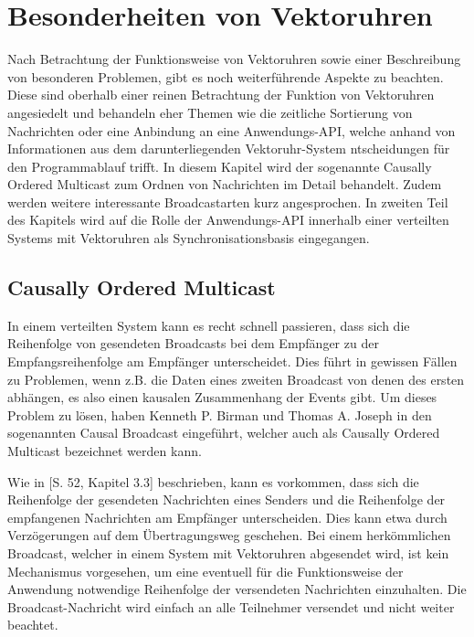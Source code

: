 \section{Besonderheiten von Vektoruhren}

Nach Betrachtung der Funktionsweise von Vektoruhren sowie einer Beschreibung von besonderen Problemen, gibt es noch weiterführende Aspekte zu beachten. Diese sind oberhalb einer reinen Betrachtung der Funktion von Vektoruhren angesiedelt und behandeln eher Themen wie die zeitliche Sortierung von Nachrichten oder eine Anbindung an eine Anwendungs-API, welche anhand von Informationen aus dem darunterliegenden Vektoruhr-System ntscheidungen für den Programmablauf trifft. In diesem Kapitel wird der sogenannte Causally Ordered Multicast zum Ordnen von Nachrichten im Detail behandelt. Zudem werden weitere interessante Broadcastarten kurz angesprochen. In zweiten Teil des Kapitels wird auf die Rolle der Anwendungs-API innerhalb einer verteilten Systems mit Vektoruhren als Synchronisationsbasis eingegangen.

\subsection{Causally Ordered Multicast}
\label{causallyorderedmulticast}
In einem verteilten System kann es recht schnell passieren, dass sich die Reihenfolge von gesendeten Broadcasts bei dem Empfänger zu der Empfangsreihenfolge am Empfänger unterscheidet. Dies führt in gewissen Fällen zu Problemen, wenn z.B. die Daten eines zweiten Broadcast von denen des ersten abhängen, es also einen kausalen Zusammenhang der Events gibt. Um dieses Problem zu lösen, haben Kenneth P. Birman und Thomas A. Joseph in \cite{Birman:1987:RCP:7351.7478} den sogenannten Causal Broadcast eingeführt, welcher auch als Causally Ordered Multicast bezeichnet werden kann.

Wie in \cite{Birman:1987:RCP:7351.7478}[S. 52, Kapitel 3.3] beschrieben, kann es vorkommen, dass sich die Reihenfolge der gesendeten Nachrichten eines Senders und die Reihenfolge der empfangenen Nachrichten am Empfänger unterscheiden. Dies kann etwa durch Verzögerungen auf dem Übertragungsweg geschehen. Bei einem herkömmlichen Broadcast, welcher in einem System mit Vektoruhren abgesendet wird, ist kein Mechanismus vorgesehen, um eine eventuell für die Funktionsweise der Anwendung notwendige Reihenfolge der versendeten Nachrichten einzuhalten. Die Broadcast-Nachricht wird einfach an alle Teilnehmer versendet und nicht weiter beachtet.

